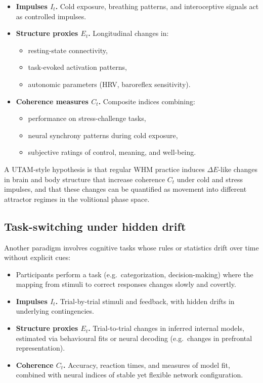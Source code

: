 \documentclass[12pt,a4paper]{report}
\begin{document}
\begin{itemize}[leftmargin=2em]
    \item \textbf{Impulses \(I_t\).} Cold exposure, breathing patterns, and interoceptive signals act as controlled impulses.
    \item \textbf{Structure proxies \(E_t\).} Longitudinal changes in:
    \begin{itemize}
        \item resting-state connectivity,
        \item task-evoked activation patterns,
        \item autonomic parameters (HRV, baroreflex sensitivity).
    \end{itemize}
    \item \textbf{Coherence measures \(C_t\).} Composite indices combining:
    \begin{itemize}
        \item performance on stress-challenge tasks,
        \item neural synchrony patterns during cold exposure,
        \item subjective ratings of control, meaning, and well-being.
    \end{itemize}
\end{itemize}

A UTAM-style hypothesis is that regular WHM practice induces $\Delta E$-like changes in brain and body structure that increase coherence \(C_t\) under cold and stress impulses, and that these changes can be quantified as movement into different attractor regimes in the volitional phase space.

\subsection*{Task-switching under hidden drift}

Another paradigm involves cognitive tasks whose rules or statistics drift over time without explicit cues:

\begin{itemize}[leftmargin=2em]
    \item Participants perform a task (e.g.\ categorization, decision-making) where the mapping from stimuli to correct responses changes slowly and covertly.
    \item \textbf{Impulses \(I_t\).} Trial-by-trial stimuli and feedback, with hidden drifts in underlying contingencies.
    \item \textbf{Structure proxies \(E_t\).} Trial-to-trial changes in inferred internal models, estimated via behavioural fits or neural decoding (e.g.\ changes in prefrontal representation).
    \item \textbf{Coherence \(C_t\).} Accuracy, reaction times, and measures of model fit, combined with neural indices of stable yet flexible network configuration.
\end{itemize}
\end{document}
